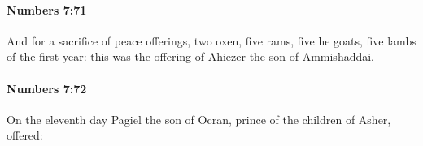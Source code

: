 		\paragraph{Numbers 7:71} %
			\label{NUMBERS-7-71}

			And for a sacrifice of peace offerings, two oxen, five rams, five he goats, five lambs of the first year: this was the offering of Ahiezer the son of Ammishaddai.


		\paragraph{Numbers 7:72} %
			\label{NUMBERS-7-72}

			On the eleventh day Pagiel the son of Ocran, prince of the children of Asher, offered:


